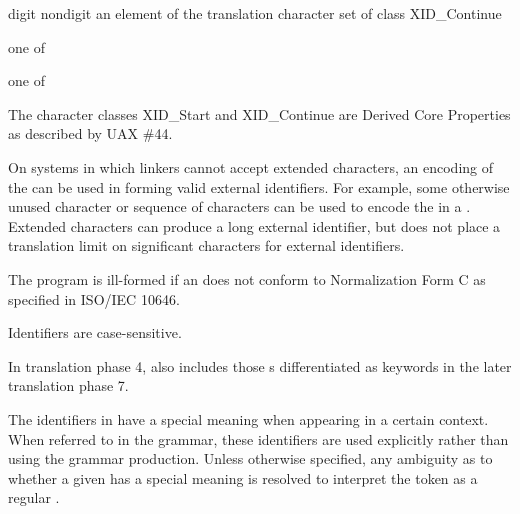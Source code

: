 \begin{bnf}
\br
    digit\br
    nondigit\br
    \textnormal{an element of the translation character set of class XID_Continue}
\end{bnf}

\begin{bnf}
 \textnormal{one of}\br
    \br
    \br
    \br
\end{bnf}

\begin{bnf}
 \textnormal{one of}\br
\end{bnf}

\pnum
{}%
%
The character classes XID_Start and XID_Continue
are Derived Core Properties as described by UAX \#44.
\begin{footnote}
On systems in which linkers cannot accept extended
characters, an encoding of the  can be used in
forming valid external identifiers. For example, some otherwise unused
character or sequence of characters can be used to encode the
 in a . Extended
characters can produce a long external identifier, but \Cpp{} does not
place a translation limit on significant characters for external
identifiers.
\end{footnote}
The program is ill-formed
if an  does not conform to
Normalization Form C as specified in ISO/IEC 10646.
\begin{note}
Identifiers are case-sensitive.
\end{note}
\begin{note}
In translation phase 4,
 also includes
those s
differentiated as keywords
in the later translation phase 7.
\end{note}

\pnum
{}%
%
%
%
The identifiers in  have a special meaning when
appearing in a certain context. When referred to in the grammar, these identifiers
are used explicitly rather than using the  grammar production.
Unless otherwise specified, any ambiguity as to whether a given
 has a special meaning is resolved to interpret the
token as a regular .

